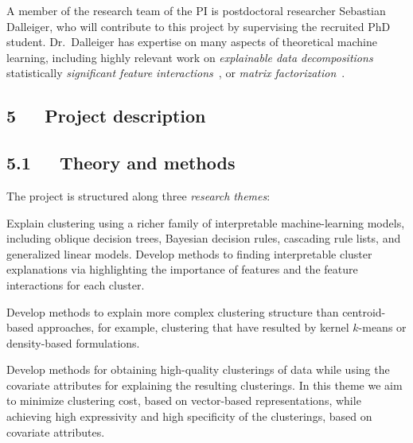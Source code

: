 \documentclass[a4paper,11pt]{article}
\begin{document}
A member of the research team of the PI is postdoctoral researcher Sebastian Dalleiger, 
who will contribute to this project by supervising the recruited PhD student.
Dr.\ Dalleiger has expertise on many aspects of theoretical machine learning, 
including highly relevant work on \emph{explainable data decompositions}~\cite{dalleiger2020explainable}
statistically \emph{significant feature interactions}~\cite{dalleiger2022spass}, 
or \emph{matrix factorization}~\cite{dalleiger2022efficiently}.

\subsection*{5~~~Project description}


\subsection*{5.1~~~Theory and methods}


The project is structured along three {\em research themes}:

\vspace{-2mm}
\begin{description}
\setlength{\itemsep}{-2pt}
\item[\rto.~\newmodels\,:] 
Explain clustering using a richer family of interpretable machine-learning models, 
including oblique decision trees, Bayesian decision rules, cascading rule lists, and 
generalized linear models. 
Develop methods to finding interpretable cluster explanations 
via highlighting the importance of features and the feature interactions for each cluster.

\item[\rtw.~\clusterings\,:] 
Develop methods to explain more complex clustering structure than centroid-based approaches,
for example, clustering that have resulted by kernel $k$-means or density-based formulations.

\item[\rth.~\covariates\,:]
Develop methods for obtaining high-quality clusterings of data 
while using the covariate attributes for explaining the resulting clusterings. 
In this theme we aim to minimize clustering cost, based on vector-based representations, 
while achieving high expressivity and high specificity of the clusterings, 
based on covariate attributes.

\end{description}
\end{document}
